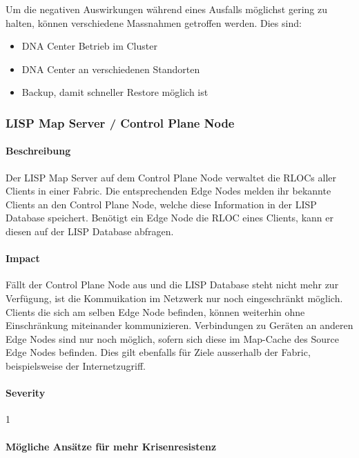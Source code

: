 Um die negativen Auswirkungen während eines Ausfalls möglichst gering zu halten, können verschiedene Massnahmen getroffen werden. Dies sind:

\begin{itemize}
\item DNA Center Betrieb im Cluster
\item DNA Center an verschiedenen Standorten
\item Backup, damit schneller Restore möglich ist
\end{itemize}

\subsubsection{LISP Map Server / Control Plane Node}

\paragraph{Beschreibung}

Der LISP Map Server auf dem Control Plane Node verwaltet die RLOCs aller Clients in einer Fabric. Die entsprechenden Edge Nodes melden ihr bekannte Clients an den Control Plane Node, welche diese Information in der LISP Database speichert. Benötigt ein Edge Node die RLOC eines Clients, kann er diesen auf der LISP Database abfragen.

\paragraph{Impact}

Fällt der Control Plane Node aus und die LISP Database steht nicht mehr zur Verfügung, ist die Kommuikation im Netzwerk nur noch eingeschränkt möglich. Clients die sich am selben Edge Node befinden, können weiterhin ohne Einschränkung miteinander kommunizieren. Verbindungen zu Geräten an anderen Edge Nodes sind nur noch möglich, sofern sich diese im Map-Cache des Source Edge Nodes befinden. Dies gilt ebenfalls für Ziele ausserhalb der Fabric, beispielsweise der Internetzugriff.

\paragraph{Severity} 1

\paragraph{Mögliche Ansätze für mehr Krisenresistenz}


